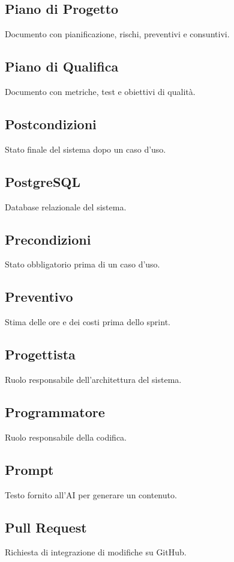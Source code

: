 \documentclass[a4paper,12pt]{article}
\begin{document}
\subsection{Piano di Progetto}
Documento con pianificazione, rischi, preventivi e consuntivi.

\subsection{Piano di Qualifica}
Documento con metriche, test e obiettivi di qualità.


\subsection{Postcondizioni}
Stato finale del sistema dopo un caso d'uso.

\subsection{PostgreSQL}
Database relazionale del sistema.

\subsection{Precondizioni}
Stato obbligatorio prima di un caso d'uso.

\subsection{Preventivo}
Stima delle ore e dei costi prima dello sprint.

\subsection{Progettista}
Ruolo responsabile dell'architettura del sistema.

\subsection{Programmatore}
Ruolo responsabile della codifica.

\subsection{Prompt}
Testo fornito all'AI per generare un contenuto.

\subsection{Pull Request}
Richiesta di integrazione di modifiche su GitHub.
\end{document}
